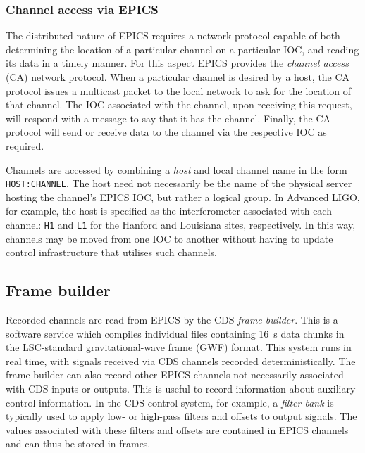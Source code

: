 \subsubsection{Channel access via EPICS}
The distributed nature of \gls{EPICS} requires a network protocol capable of both determining the location of a particular channel on a particular \gls{IOC}, and reading its data in a timely manner. For this aspect \gls{EPICS} provides the \emph{channel access} (\gls{CA}) network protocol. When a particular channel is desired by a host, the \gls{CA} protocol issues a multicast packet to the local network to ask for the location of that channel. The \gls{IOC} associated with the channel, upon receiving this request, will respond with a message to say that it has the channel. Finally, the \gls{CA} protocol will send or receive data to the channel via the respective \gls{IOC} as required.

Channels are accessed by combining a \emph{host} and local channel name in the form \lstinline{HOST:CHANNEL}. The host need not necessarily be the name of the physical server hosting the channel's \gls{EPICS} \gls{IOC}, but rather a logical group. In Advanced LIGO, for example, the host is specified as the interferometer associated with each channel: \lstinline{H1} and \lstinline{L1} for the Hanford and Louisiana sites, respectively. In this way, channels may be moved from one \gls{IOC} to another without having to update control infrastructure that utilises such channels.

\subsection{Frame builder}
Recorded channels are read from \gls{EPICS} by the \gls{CDS} \emph{frame builder}. This is a software service which compiles individual files containing \SI{16}{\second} data chunks in the \gls{LSC}-standard gravitational-wave frame (\gls{GWF}) format. This system runs in real time, with signals received via \gls{CDS} channels recorded deterministically. The frame builder can also record other EPICS channels not necessarily associated with \gls{CDS} inputs or outputs. This is useful to record information about auxiliary control information. In the \gls{CDS} control system, for example, a \emph{filter bank} is typically used to apply low- or high-pass filters and offsets to output signals. The values associated with these filters and offsets are contained in EPICS channels and can thus be stored in frames.

